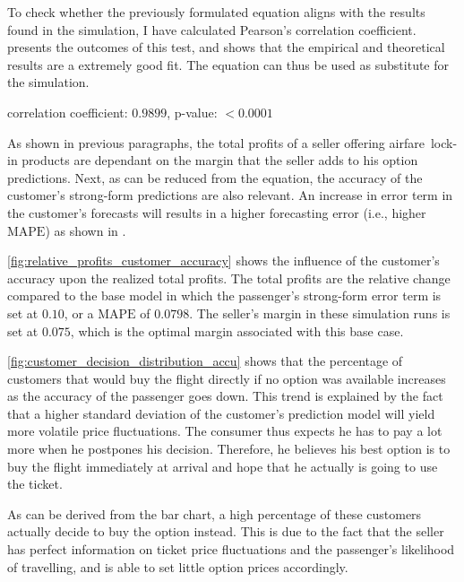 To check whether the previously formulated equation aligns with the results found in the simulation, I have calculated Pearson's correlation coefficient.  presents the outcomes of this test, and shows that the empirical and theoretical results are a extremely good fit. The equation can thus be used as substitute for the simulation.

correlation coefficient: $0.9899$, p-value: $< 0.0001$

As shown in previous paragraphs, the total profits of a seller offering airfare~lock-in products are dependant on the margin that the seller adds to his option predictions. Next, as can be reduced from the equation, the accuracy of the customer's strong-form predictions are also relevant. An increase in error term in the customer's forecasts will results in a higher forecasting error (i.e., higher $\mbox{MAPE}$) as shown in .

\autoref{fig:relative_profits_customer_accuracy} shows the influence of the customer's accuracy upon the realized total profits. The total profits are the relative change compared to the base model in which the passenger's strong-form error term is set at $0.10$, or a $\mbox{MAPE}$ of $0.0798$. The seller's margin in these simulation runs is set at $0.075$, which is the optimal margin associated with this base case.


\autoref{fig:customer_decision_distribution_accu} shows that the percentage of customers that would buy the flight directly if no option was available increases as the accuracy of the passenger goes down. This trend is explained by the fact that a higher standard deviation of the customer's prediction model will yield more volatile price fluctuations. The consumer thus expects he has to pay a lot more when he postpones his decision. Therefore, he believes his best option is to buy the flight immediately at arrival and hope that he actually is going to use the ticket.

As can be derived from the bar chart, a high percentage of these customers actually decide to buy the option instead. This is due to the fact that the seller has perfect information on ticket price fluctuations and the passenger's likelihood of travelling, and is able to set little option prices accordingly.


